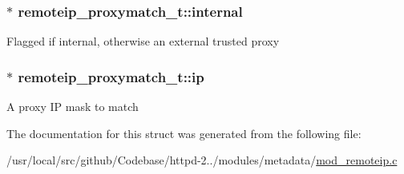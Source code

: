 \subsubsection[{\texorpdfstring{internal}{internal}}]{$\ast$ remoteip\+\_\+proxymatch\+\_\+t\+::internal}\hypertarget{structremoteip__proxymatch__t_a62cfdc644d931e99e77819e3cff26094}{}\label{structremoteip__proxymatch__t_a62cfdc644d931e99e77819e3cff26094}
Flagged if internal, otherwise an external trusted proxy 
\subsubsection[{\texorpdfstring{ip}{ip}}]{$\ast$ remoteip\+\_\+proxymatch\+\_\+t\+::ip}\hypertarget{structremoteip__proxymatch__t_aad4a9195988bd9d441d30eb9b47847d0}{}\label{structremoteip__proxymatch__t_aad4a9195988bd9d441d30eb9b47847d0}
A proxy IP mask to match 

The documentation for this struct was generated from the following file\+:\begin{DoxyCompactItemize}
\item 
/usr/local/src/github/\+Codebase/httpd-\/2../modules/metadata/\hyperlink{mod__remoteip_8c}{mod\+\_\+remoteip.\+c}\end{DoxyCompactItemize}
